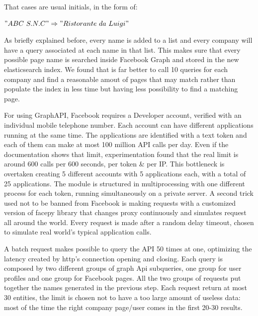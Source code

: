 That cases are usual initials, in the form of:

$ "ABC\ S.N.C" \Rightarrow "Ristorante\ da\ Luigi" $

As briefly explained before, every name is added to a list and every company will have a query associated at each name in that list. This makes sure that every possible page name is searched inside Facebook Graph and stored in the new elasticsearch index. We found that is far better to call 10 queries for each company and find a reasonable amout of pages that may match rather than populate the index in less time but having less possibility to find a matching page.

For using GraphAPI, Facebook requires a Developer account, verified with an individual mobile telephone number. Each account can have different applications running at the same time. The applications are identified with a text token and each of them can make at most 100 million API calls per day\cite{apipolices}. Even if the documentation shows that limit, experimentation found that the real limit is around 600 calls per 600 seconds, per token \& per IP\cite{realapilimit}. This bottleneck is overtaken creating 5 different accounts with 5 applications each, with a total of 25 applications.
The module is structured in multiprocessing with one different process for each token, running simultaneously on a private server. A second trick used not to be banned from Facebook is making requests with a customized version of facepy\cite{facepy} library that changes proxy continuously and simulates request all around the world. Every request is made after a random delay timeout, chosen to simulate real world's typical application calls.


A batch request makes possible to query the API 50 times at one, optimizing the latency created by http's connection opening and closing.  Each query is composed by two different groups of graph Api subqueries, one group for user profiles and one group for Facebook pages. All the two groups of requests put together the names generated in the previous step. Each request return at most 30 entities, the limit is chosen not to have a too large amount of useless data: most of the time the right company page/user comes in the first 20-30 results.

